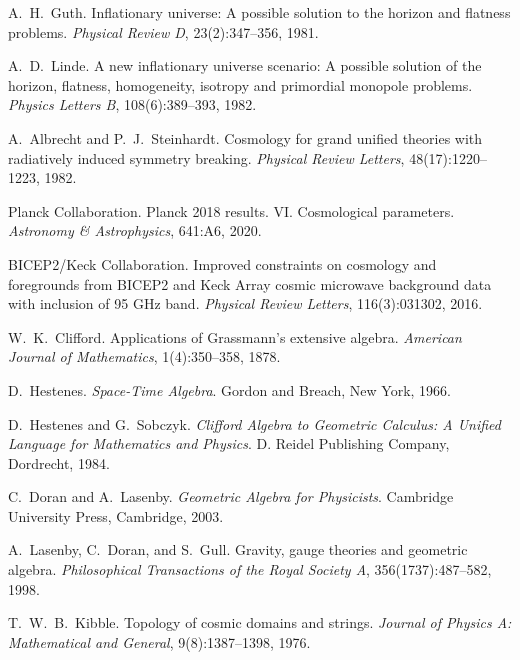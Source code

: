 \documentclass[11pt,a4paper]{article}
\numberwithin{equation}{section}
\theoremstyle{plain}
\theoremstyle{definition}
\theoremstyle{remark}
\begin{document}
\begin{thebibliography}{99}

A.~H.~Guth.
\newblock Inflationary universe: A possible solution to the horizon and flatness problems.
\newblock \emph{Physical Review D}, 23(2):347--356, 1981.

A.~D.~Linde.
\newblock A new inflationary universe scenario: A possible solution of the horizon, flatness, homogeneity, isotropy and primordial monopole problems.
\newblock \emph{Physics Letters B}, 108(6):389--393, 1982.

A.~Albrecht and P.~J.~Steinhardt.
\newblock Cosmology for grand unified theories with radiatively induced symmetry breaking.
\newblock \emph{Physical Review Letters}, 48(17):1220--1223, 1982.

Planck Collaboration.
\newblock Planck 2018 results. VI. Cosmological parameters.
\newblock \emph{Astronomy \& Astrophysics}, 641:A6, 2020.

BICEP2/Keck Collaboration.
\newblock Improved constraints on cosmology and foregrounds from BICEP2 and Keck Array cosmic microwave background data with inclusion of 95 GHz band.
\newblock \emph{Physical Review Letters}, 116(3):031302, 2016.

W.~K.~Clifford.
\newblock Applications of Grassmann's extensive algebra.
\newblock \emph{American Journal of Mathematics}, 1(4):350--358, 1878.

D.~Hestenes.
\newblock \emph{Space-Time Algebra}.
\newblock Gordon and Breach, New York, 1966.

D.~Hestenes and G.~Sobczyk.
\newblock \emph{Clifford Algebra to Geometric Calculus: A Unified Language for Mathematics and Physics}.
\newblock D. Reidel Publishing Company, Dordrecht, 1984.

C.~Doran and A.~Lasenby.
\newblock \emph{Geometric Algebra for Physicists}.
\newblock Cambridge University Press, Cambridge, 2003.

A.~Lasenby, C.~Doran, and S.~Gull.
\newblock Gravity, gauge theories and geometric algebra.
\newblock \emph{Philosophical Transactions of the Royal Society A}, 356(1737):487--582, 1998.

T.~W.~B.~Kibble.
\newblock Topology of cosmic domains and strings.
\newblock \emph{Journal of Physics A: Mathematical and General}, 9(8):1387--1398, 1976.


\end{thebibliography}
\end{document}
